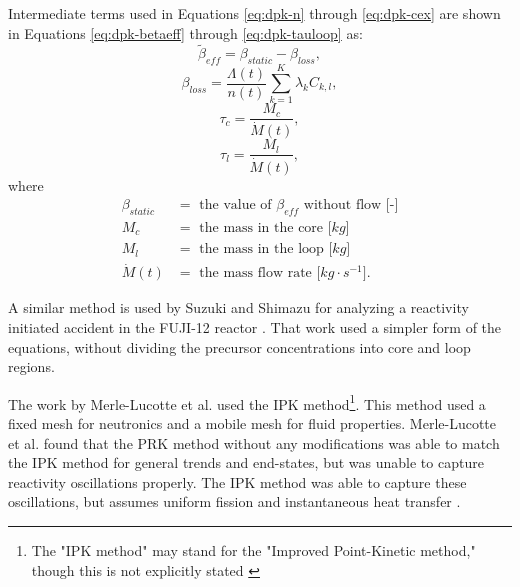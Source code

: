 Intermediate terms used in Equations \eqref{eq:dpk-n} through \eqref{eq:dpk-cex} are shown in Equations \eqref{eq:dpk-betaeff} through \eqref{eq:dpk-tauloop} as:
\begin{equation}
    \tilde{\beta}_{eff} = \beta_{static} - \beta_{loss},
    \label{eq:dpk-betaeff}
\end{equation}
\begin{equation}
    \beta_{loss} = \frac{\Lambda(t)}{n(t)} \sum_{k=1}^K \lambda_k C_{k, l},
    \label{eq:dpk-betaloss}
\end{equation}
\begin{equation}
    \tau_{c} = \frac{M_{c}}{\dot{M}(t)},
    \label{eq:dpk-taucore}
\end{equation}
\begin{equation}
    \tau_{l} = \frac{M_{l}}{\dot{M}(t)},
    \label{eq:dpk-tauloop}
\end{equation}
where
\begin{align}
\beta_{static} &= \mbox{ the value of $\beta_{eff}$ without flow [-]} \nonumber \\ 
M_{c} &= \mbox{ the mass in the core [$kg$]} \nonumber \\ 
M_{l} &= \mbox{ the mass in the loop [$kg$]} \nonumber \\ 
\dot{M}(t) &= \mbox{ the mass flow rate [$kg \cdot s^{-1}$].} \nonumber
\end{align}



A similar method is used by Suzuki and Shimazu for analyzing a reactivity initiated accident in the FUJI-12 reactor \cite{suzuki2008reactivity}.
That work used a simpler form of the equations, without dividing the precursor concentrations into core and loop regions.

The work by Merle-Lucotte et al. used the IPK method\footnote{The "IPK method" may stand for the "Improved Point-Kinetic method," though this is not explicitly stated \cite{merle2015physical}}.
This method used a fixed mesh for neutronics and a mobile mesh for fluid properties.
Merle-Lucotte et al. found that the \gls{PRK} method without any modifications was able to match the IPK method for general trends and end-states, but was unable to capture reactivity oscillations properly.
The IPK method was able to capture these oscillations, but assumes uniform fission and instantaneous heat transfer \cite{merle2015physical}.

